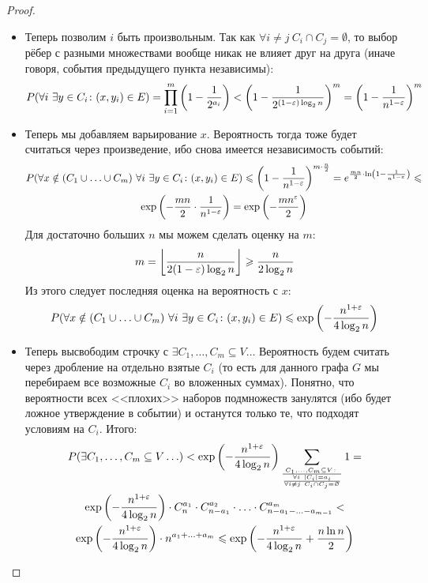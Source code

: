 \begin{proof}
\begin{itemize}
		\item Теперь позволим $i$ быть произвольным. Так как $\forall i \neq j\ C_i \cap C_j = \emptyset$, то выбор рёбер с разными множествами вообще никак не влияет друг на друга (иначе говоря, события предыдущего пункта независимы):
		\[
			P(\forall i\ \exists y \in C_i \colon (x, y_i) \in E) = \prod_{i = 1}^m \left(1 - \frac{1}{2^{a_i}}\right) < \left(1 - \frac{1}{2^{(1 - \varepsilon)\log_2 n}}\right)^m = \left(1 - \frac{1}{n^{1 - \varepsilon}}\right)^m
		\]
		
		\item Теперь мы добавляем варьирование $x$. Вероятность тогда тоже будет считаться через произведение, ибо снова имеется независимость событий:
		\begin{multline*}
			P(\forall x \notin (C_1 \cup \ldots \cup C_m)\ \forall i\ \exists y \in C_i \colon (x, y_i) \in E) \le \ps{1 - \frac{1}{n^{1 - \eps}}}^{m \cdot \frac{n}{2}} = e^{\frac{mn}{2} \cdot \ln \ps{1 - \frac{1}{n^{1 - \eps}}}} \le
			\\
			\exp\ps{-\frac{mn}{2} \cdot \frac{1}{n^{1 - \eps}}} = \exp\ps{-\frac{mn^\eps}{2}}
		\end{multline*}
		Для достаточно больших $n$ мы можем сделать оценку на $m$:
		\[
			m = \left\lfloor \frac{n}{2(1 - \varepsilon)\log_2 n} \right\rfloor \geqslant \frac{n}{2\log_2 n}
		\]
		Из этого следует последняя оценка на вероятность с $x$:
		\[
		P(\forall x \notin (C_1 \cup \ldots \cup C_m)\ \forall i\ \exists y \in C_i \colon (x, y_i) \in E) \leqslant \exp\left(-\frac{n^{1 + \varepsilon}}{4\log_2 n}\right)
		\]
		
		\item Теперь высвободим строчку с $\exists C_1, \ldots, C_m \subseteq V \ldots$ Вероятность будем считать через дробление на отдельно взятые $C_i$ (то есть для данного графа $G$ мы перебираем все возможные $C_i$ во вложенных суммах). Понятно, что вероятности всех <<плохих>> наборов подмножеств занулятся (ибо будет ложное утверждение в событии) и останутся только те, что подходят условиям на $C_i$. Итого:
		\begin{multline*}
			P(\exists C_1, \ldots, C_m \subseteq V \ldots) < \exp\ps{-\frac{n^{1 + \eps}}{4\log_2 n}} \sum_{C_1, \ldots, C_m \subseteq V \colon \over {\forall i\ |C_i| = a_i \over \forall i \neq j\ C_i \cap C_j = \emptyset}} 1 =
			\\
			\exp\ps{-\frac{n^{1 + \eps}}{4\log_2 n}} \cdot C_n^{a_1} \cdot C_{n - a_1}^{a_2} \cdot \ldots \cdot  C_{n - a_1 - \ldots - a_{m - 1}}^{a_m} <
			\\
			\exp\ps{-\frac{n^{1 + \eps}}{4\log_2 n}} \cdot n^{a_1 + \ldots + a_m} \le \exp\ps{-\frac{n^{1 + \eps}}{4\log_2 n} + \frac{n \ln n}{2}}
		\end{multline*}
		

\end{itemize}
\end{proof}

